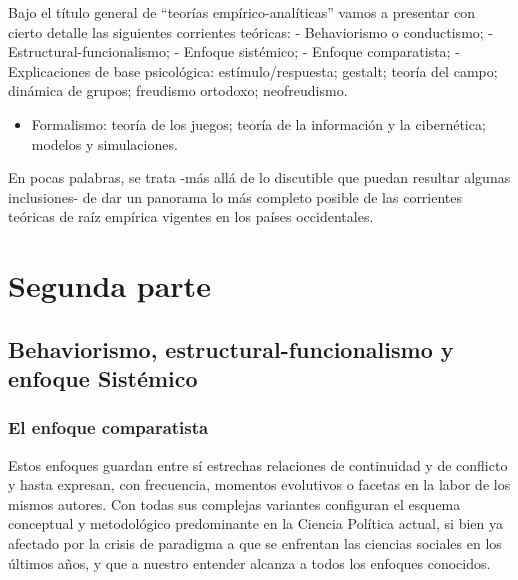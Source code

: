 \documentclass[
]{book}
\providecommand{\tightlist}{%
  \setlength{\itemsep}{0pt}\setlength{\parskip}{0pt}}
\begin{document}
Bajo el título general de ``teorías empírico-analíticas'' vamos a presentar con cierto detalle las siguientes corrientes teóricas: - Behaviorismo o conductismo; - Estructural-funcionalismo; - Enfoque sistémico; - Enfoque comparatista; - Explicaciones de base psicológica: estímulo/respuesta; gestalt; teoría del campo; dinámica de grupos; freudismo ortodoxo; neofreudismo.

\begin{itemize}
\tightlist
\item
  Formalismo: teoría de los juegos; teoría de la información y la cibernética; modelos y simulaciones.
\end{itemize}

En pocas palabras, se trata -más allá de lo discutible que puedan resultar algunas inclusiones- de dar un panorama lo más completo posible de las corrientes teóricas de raíz empírica vigentes en los países occidentales.

\hypertarget{segunda-parte-2}{%
\section*{Segunda parte}\label{segunda-parte-2}}

\hypertarget{behaviorismo-estructural-funcionalismo-y-enfoque-sistuxe9mico}{%
\subsection*{Behaviorismo, estructural-funcionalismo y enfoque Sistémico}\label{behaviorismo-estructural-funcionalismo-y-enfoque-sistuxe9mico}}

\hypertarget{el-enfoque-comparatista}{%
\subsubsection*{El enfoque comparatista}\label{el-enfoque-comparatista}}

Estos enfoques guardan entre sí estrechas relaciones de continuidad y de conflicto y hasta expresan, con frecuencia, momentos evolutivos o facetas en la labor de los mismos autores. Con todas sus complejas variantes configuran el esquema conceptual y metodológico predominante en la Ciencia Política actual, si bien ya afectado por la crisis de paradigma a que se enfrentan las ciencias sociales en los últimos años, y que a nuestro entender alcanza a todos los enfoques conocidos.
\end{document}
